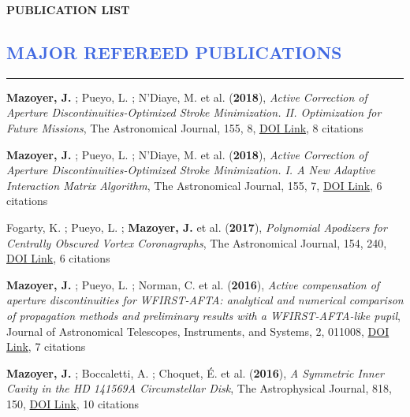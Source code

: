 \documentclass[11pt]{article}
\begin{document}
\begin{center}\begin{Large}
\textbf{PUBLICATION LIST}
\end{Large}\end{center}

\setcounter{section}{0}



\vspace{-0.5cm}
\textcolor{RoyalBlue}{\section{MAJOR REFEREED PUBLICATIONS}
\vspace{-0.25cm}\hrule}
\vspace{0.6cm}

\begin{etaremune} \itemsep 0pt

\item {\bf Mazoyer, J.} ; Pueyo, L. ; N'Diaye, M. et al. ({\bf2018}), {\it Active Correction of Aperture Discontinuities-Optimized Stroke Minimization. II. Optimization for Future Missions}, The Astronomical Journal, 155, 8, \href{https://doi.org/10.3847/1538-3881/aa91d7}{DOI Link}, 8 citations

 \item {\bf Mazoyer, J.} ; Pueyo, L. ; N'Diaye, M. et al. ({\bf2018}), {\it Active Correction of Aperture Discontinuities-Optimized Stroke Minimization. I. A New Adaptive Interaction Matrix Algorithm}, The Astronomical Journal, 155, 7, \href{https://doi.org/10.3847/1538-3881/aa91cf}{DOI Link}, 6 citations

 \item Fogarty, K. ; Pueyo, L. ; {\bf Mazoyer, J.} et al. ({\bf2017}), {\it Polynomial Apodizers for Centrally Obscured Vortex Coronagraphs}, The Astronomical Journal, 154, 240, \href{https://doi.org/10.3847/1538-3881/aa9063}{DOI Link}, 6 citations

 \item {\bf Mazoyer, J.} ; Pueyo, L. ; Norman, C. et al. ({\bf2016}), {\it Active compensation of aperture discontinuities for WFIRST-AFTA: analytical and numerical comparison of propagation methods and preliminary results with a WFIRST-AFTA-like pupil}, Journal of Astronomical Telescopes, Instruments, and Systems, 2, 011008, \href{https://doi.org/10.1117/1.JATIS.2.1.011008}{DOI Link}, 7 citations

 \item {\bf Mazoyer, J.} ; Boccaletti, A. ; Choquet, {\'E}. et al. ({\bf2016}), {\it A Symmetric Inner Cavity in the HD 141569A Circumstellar Disk}, The Astrophysical Journal, 818, 150, \href{https://doi.org/10.3847/0004-637X/818/2/150}{DOI Link}, 10 citations


\end{etaremune}
\end{document}
